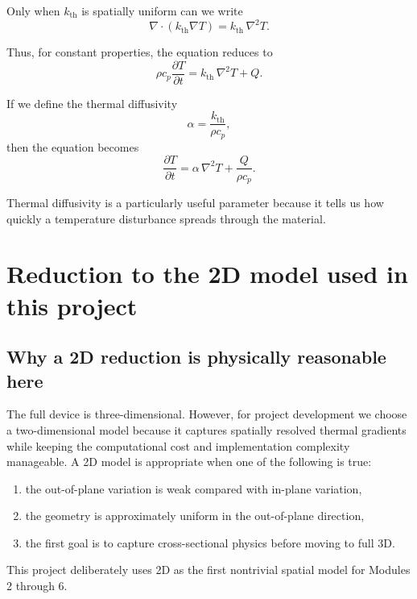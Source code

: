 \documentclass[11pt]{article}
\newcommand{\kth}{k_{\mathrm{th}}}
\begin{document}
Only when $\kth$ is spatially uniform can we write
\begin{equation}
\nabla \cdot (\kth \nabla T) = \kth \, \nabla^2 T.
\end{equation}

Thus, for constant properties, the equation reduces to
\begin{equation}
\rho c_p \frac{\partial T}{\partial t} = \kth \, \nabla^2 T + Q.
\end{equation}

If we define the thermal diffusivity
\begin{equation}
\alpha = \frac{\kth}{\rho c_p},
\end{equation}
then the equation becomes
\begin{equation}
\frac{\partial T}{\partial t} = \alpha \, \nabla^2 T + \frac{Q}{\rho c_p}.
\end{equation}

Thermal diffusivity is a particularly useful parameter because it tells us how quickly a temperature disturbance spreads through the material.

\section{Reduction to the 2D model used in this project}

\subsection{Why a 2D reduction is physically reasonable here}

The full device is three-dimensional. However, for project development we choose a two-dimensional model because it captures spatially resolved thermal gradients while keeping the computational cost and implementation complexity manageable. A 2D model is appropriate when one of the following is true:
\begin{enumerate}[label=\arabic*.]
    \item the out-of-plane variation is weak compared with in-plane variation,
    \item the geometry is approximately uniform in the out-of-plane direction,
    \item the first goal is to capture cross-sectional physics before moving to full 3D.
\end{enumerate}

This project deliberately uses 2D as the first nontrivial spatial model for Modules 2 through 6.
\end{document}

